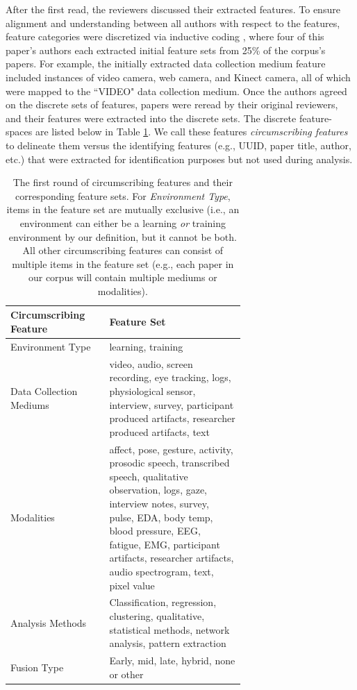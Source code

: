 \documentclass[manuscript,screen,review]{acmart}
\begin{document}
After the first read, the reviewers discussed their extracted features. To ensure alignment and understanding between all authors with respect to the features, feature categories were discretized via inductive coding \cite{thomas2003general}, where four of this paper's authors each extracted initial feature sets from 25\% of the corpus's papers. For example, the initially extracted data collection medium feature included instances of video camera, web camera, and Kinect camera, all of which were mapped to the ``VIDEO" data collection medium. Once the authors agreed on the discrete sets of features, papers were reread by their original reviewers, and their features were extracted into the discrete sets. The discrete feature-spaces are listed below in Table \ref{tab:circumscribing_features_1}. We call these features \textit{circumscribing features} to delineate them versus the identifying features (e.g., UUID, paper title, author, etc.) that were extracted for identification purposes but not used during analysis. 

\begin{table}[htbp]
    \renewcommand{\arraystretch}{1.3}%
    \centering
    \caption{The first round of circumscribing features and their corresponding feature sets. For \textit{Environment Type}, items in the feature set are mutually exclusive (i.e., an environment can either be a learning \textit{or} training environment by our definition, but it cannot be both. All other circumscribing features can consist of multiple items in the feature set (e.g., each paper in our corpus will contain multiple mediums or modalities).}
    \begin{tabular}{p{0.22\linewidth}@{\hskip .1in} | @{\hskip .1in}p{0.45\linewidth}@{\hskip .1in}}
        \toprule
        Circumscribing Feature & Feature Set\\
        
        \toprule
        Environment Type & learning, training\\
        Data Collection Mediums & video, audio, screen recording, eye tracking, logs, physiological sensor, interview, survey, participant produced artifacts, researcher produced artifacts, text\\
        Modalities & affect, pose, gesture, activity, prosodic speech, transcribed speech, qualitative observation, logs, gaze, interview notes, survey, pulse, EDA, body temp, blood pressure, EEG, fatigue, EMG, participant artifacts, researcher artifacts, audio spectrogram, text, pixel value\\
        Analysis Methods & Classification, regression, clustering, qualitative, statistical methods, network analysis, pattern extraction \\
        Fusion Type & Early, mid, late, hybrid, none or other\\

        \bottomrule
    \end{tabular}
    \label{tab:circumscribing_features_1}
\end{table}
\end{document}

